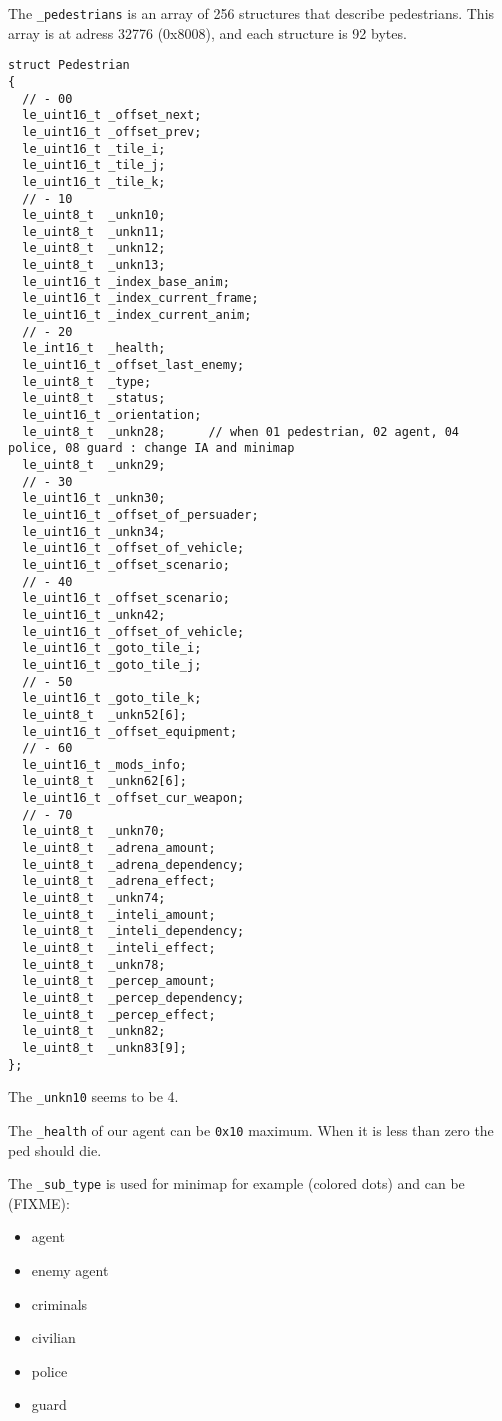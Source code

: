 \documentclass[a4paper,twoside,12pt,dvips]{article}
\begin{document}
The \texttt{\_pedestrians} is an array of 256 structures that describe pedestrians. This array is at adress 32776 (0x8008), and each structure is 92 bytes.

\begin{lstlisting}
struct Pedestrian
{
  // - 00
  le_uint16_t _offset_next;
  le_uint16_t _offset_prev;
  le_uint16_t _tile_i;
  le_uint16_t _tile_j;
  le_uint16_t _tile_k;
  // - 10
  le_uint8_t  _unkn10;
  le_uint8_t  _unkn11;
  le_uint8_t  _unkn12;
  le_uint8_t  _unkn13;
  le_uint16_t _index_base_anim;
  le_uint16_t _index_current_frame;
  le_uint16_t _index_current_anim;
  // - 20
  le_int16_t  _health;
  le_uint16_t _offset_last_enemy;
  le_uint8_t  _type;
  le_uint8_t  _status;
  le_uint16_t _orientation;
  le_uint8_t  _unkn28;      // when 01 pedestrian, 02 agent, 04 police, 08 guard : change IA and minimap
  le_uint8_t  _unkn29;
  // - 30
  le_uint16_t _unkn30;
  le_uint16_t _offset_of_persuader;
  le_uint16_t _unkn34;
  le_uint16_t _offset_of_vehicle;
  le_uint16_t _offset_scenario;
  // - 40
  le_uint16_t _offset_scenario;
  le_uint16_t _unkn42;
  le_uint16_t _offset_of_vehicle;
  le_uint16_t _goto_tile_i;
  le_uint16_t _goto_tile_j;
  // - 50
  le_uint16_t _goto_tile_k;
  le_uint8_t  _unkn52[6];
  le_uint16_t _offset_equipment;
  // - 60
  le_uint16_t _mods_info;
  le_uint8_t  _unkn62[6];
  le_uint16_t _offset_cur_weapon;
  // - 70
  le_uint8_t  _unkn70;
  le_uint8_t  _adrena_amount;
  le_uint8_t  _adrena_dependency;
  le_uint8_t  _adrena_effect;
  le_uint8_t  _unkn74;
  le_uint8_t  _inteli_amount;
  le_uint8_t  _inteli_dependency;
  le_uint8_t  _inteli_effect;
  le_uint8_t  _unkn78;
  le_uint8_t  _percep_amount;
  le_uint8_t  _percep_dependency;
  le_uint8_t  _percep_effect;
  le_uint8_t  _unkn82;
  le_uint8_t  _unkn83[9];
};
\end{lstlisting}

The \texttt{\_unkn10} seems to be 4.

The \texttt{\_health} of our agent can be \texttt{0x10} maximum. When it is less than zero the ped should die.

The \texttt{\_sub\_type} is used for minimap for example (colored dots) and can be (FIXME):
\begin{itemize}
\item agent
\item enemy agent
\item criminals
\item civilian
\item police
\item guard
\end{itemize}
\end{document}
